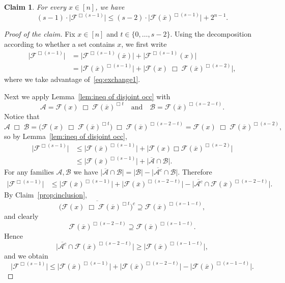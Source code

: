\documentclass[11pt]{article}
\newtheorem{claim}[theorem]{Claim}
\theoremstyle{definition}
\newenvironment{poc}{\begin{proof}[Proof of the claim]\renewcommand*{\qedsymbol}{$\blacksquare$}}{\end{proof}}
\begin{document}
\begin{claim}\label{prop:bound diversity}
 For every $x\in[n]$, we have
\[
   (s-1)\cdot\bigl|\mathcal{F}^{\Box (s-1)}\bigr|
   \le
   (s-2)\cdot\bigl|\mathcal{F}(\overline{x})^{\Box (s-1)}\bigr|
   + 2^{n-1}.
\]
\end{claim}
\begin{poc}
Fix $x\in[n]$ and $t\in\{0,\dots,s-2\}$. Using the decomposition according to whether a set contains $x$, we first write
\begin{align*}
   \bigl|\mathcal{F}^{\Box(s-1)}\bigr|
   &= \bigl|\mathcal{F}^{\Box(s-1)}(\overline{x})\bigr|
      + \bigl|\mathcal{F}^{\Box(s-1)}(x)\bigr|\\
   &= \bigl|\mathcal{F}(\overline{x})^{\Box(s-1)}\bigr|
      + \bigl|\mathcal{F}(x)\;\Box\;\mathcal{F}(\overline{x})^{\Box(s-2)}\bigr|,
\end{align*}
where we take advantage of~\eqref{eq:exchange1}.

Next we apply Lemma~\ref{lem:ineq of disjoint occ} with
\[
   \mathcal{A} = \mathcal{F}(x)\;\Box\;\mathcal{F}(\overline{x})^{\Box t}
   \quad\text{and}\quad
   \mathcal{B} = \mathcal{F}(\overline{x})^{\Box(s-2-t)}.
\]
Notice that
\[
   \mathcal{A}\;\Box\;\mathcal{B}
   = \bigl(\mathcal{F}(x)\;\Box\;\mathcal{F}(\overline{x})^{\Box t}\bigr)
     \;\Box\;\mathcal{F}(\overline{x})^{\Box(s-2-t)}
   = \mathcal{F}(x)\;\Box\;\mathcal{F}(\overline{x})^{\Box(s-2)},
\]
so by Lemma~\ref{lem:ineq of disjoint occ},
\begin{align*}
   \bigl|\mathcal{F}^{\Box(s-1)}\bigr|
   &\le \bigl|\mathcal{F}(\overline{x})^{\Box(s-1)}\bigr|
      + \bigl|\mathcal{F}(x)\Box\mathcal{F}(\overline{x})^{\Box(s-2)}\bigr|\\
   &\le \bigl|\mathcal{F}(\overline{x})^{\Box(s-1)}\bigr|
      + \bigl|\overline{\mathcal{A}}\cap\mathcal{B}\bigr|.
\end{align*}
For any families $\mathcal{A},\mathcal{B}$ we have
\(
   \bigl|\overline{\mathcal{A}}\cap\mathcal{B}\bigr|
   = |\mathcal{B}| - \bigl|\overline{\mathcal{A}^{c}}\cap\mathcal{B}\bigr|.
\)
 Therefore
\begin{align*}
   \bigl|\mathcal{F}^{\Box(s-1)}\bigr|
   &\le \bigl|\mathcal{F}(\overline{x})^{\Box(s-1)}\bigr|
      + \bigl|\mathcal{F}(\overline{x})^{\Box(s-2-t)}\bigr|
      - \bigl|\overline{\mathcal{A}^c}
               \cap\mathcal{F}(\overline{x})^{\Box(s-2-t)}\bigr|.
\end{align*}
By Claim~\ref{prop:inclusion},
\[
   \overline{\bigl(\mathcal{F}(x)\;\Box\;\mathcal{F}(\overline{x})^{\Box t}\bigr)^{c}}
   \supseteq \mathcal{F}(\overline{x})^{\Box(s-1-t)},
\]
and clearly
\[
   \mathcal{F}(\overline{x})^{\Box(s-2-t)}
   \supseteq \mathcal{F}(\overline{x})^{\Box(s-1-t)}.
\]
Hence
\[
   \bigl|\overline{\mathcal{A}^c}
          \cap\mathcal{F}(\overline{x})^{\Box(s-2-t)}\bigr|
   \ge
   \bigl|\mathcal{F}(\overline{x})^{\Box(s-1-t)}\bigr|,
\]
and we obtain
\begin{equation}\label{eq:bound F(overline x)}
   \bigl|\mathcal{F}^{\Box(s-1)}\bigr|
   \le \bigl|\mathcal{F}(\overline{x})^{\Box(s-1)}\bigr|
      + \bigl|\mathcal{F}(\overline{x})^{\Box(s-2-t)}\bigr|
      - \bigl|\mathcal{F}(\overline{x})^{\Box(s-1-t)}\bigr|.
\end{equation}


\end{poc}
\end{document}
